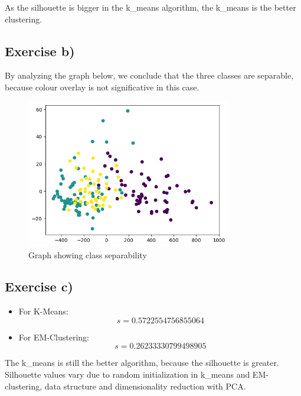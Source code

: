\documentclass{article}
\begin{document}
As the silhouette is bigger in the k\_means algorithm, the k\_means is the better clustering.

\subsection{Exercise b)}

By analyzing the graph below, we conclude that the three classes are separable, because colour overlay is not significative in this case.


\begin{figure}[h]
    \centering
    \includegraphics[width=0.8\textwidth]{output.png}
    \caption{Graph showing class separability}
\end{figure}


\newpage
\subsection{Exercise c)}

\begin{itemize}
    \item For K-Means: 
    \[
    s = 0.5722554756855064
    \]
    
    \item For EM-Clustering: 
    \[
    s = 0.26233330799498905
    \]
\end{itemize}

The k\_means is still the better algorithm, because the silhouette is greater. Silhouette values vary due to random initialization in k\_means and EM-clustering, data structure and dimensionality reduction with PCA.
\end{document}

